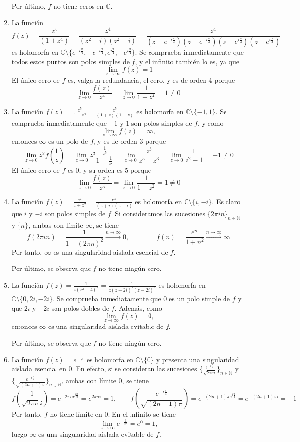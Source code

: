 \documentclass[11pt]{report}
\makeatletter
\renewenvironment{proof}[1][\proofname]{\par
  \pushQED{\qed}%
  \normalfont \topsep\z@skip %
  \trivlist
  \item[\hskip\labelsep
        \itshape
    #1\@addpunct{.}]\ignorespaces
}{%
  \popQED\endtrivlist\@endpefalse
}
\newcommand{\N}{\mathbb N}
\newcommand{\C}{\mathbb C}
\makeatother
\begin{document}
\begin{proof}
\begin{enumerate}
    Por último, $f$ no tiene ceros en $\C$.
    \item La función \[f(z)=\frac{z^4}{(1+z^4)} = \frac{z^4}{(z^2+i)(z^2-i)} = \frac{z^4}{(z-e^{-i\frac{\pi}{4}})(z+e^{-i\frac{\pi}{4}})(z-e^{i\frac{\pi}{4}})(z+e^{i\frac{\pi}{4}})}\]
    es holomorfa en $\C \setminus \{e^{-i\frac{\pi}{4}}, -e^{-i\frac{\pi}{4}},e^{i\frac{\pi}{4}},-e^{i\frac{\pi}{4}}\}$. Se comprueba inmediatamente que todos estos puntos son polos simples de $f$, y el infinito también lo es, ya que
    \[\lim_{z \to \infty}f(z) = 1\]
    El único cero de $f$ es, valga la redundancia, el cero, y es de orden $4$ porque \[\lim_{z \to 0} \frac{f(z)}{z^4} = \lim_{z \to 0} \frac{1}{1+z^4} = 1 \neq 0\]
    \item La función $f(z)=\frac{z^5}{1-z^2} = \frac{z^5}{(1+z)(1-z)}$ es holomorfa en $\C \setminus \{-1,1\}$. Se comprueba inmediatamente que $-1$ y $1$ son polos simples de $f$, y como
    \[\lim_{z \to \infty} f(z)=\infty,\]
    entonces $\infty$ es un polo de $f$, y es de orden $3$ porque
    \[\lim_{z \to 0} z^3f\left(\frac{1}{z}\right) = \lim_{z \to 0}z^3 \frac{\frac{1}{z^5}}{1-\frac{1}{z^2}} = \lim_{z \to 0} \frac{z^3}{z^5-z^3} = \lim_{z \to 0} \frac{1}{z^2-1} = -1 \neq 0\]
    El único cero de $f$ es $0$, y su orden es $5$ porque
    \[\lim_{z \to 0}\frac{f(z)}{z^5} = \lim_{z \to 0} \frac{1}{1-z^2} = 1 \neq 0\]
    \item La función $f(z)=\frac{e^z}{1+z^2} = \frac{e^z}{(z+i)(z-i)}$ es holomorfa en $\C \setminus \{i,-i\}$. Es claro que $i$ y $-i$ son polos simples de $f$. Si consideramos las sucesiones $\{2\pi in\}_{n \in \N}$ y $\{n\}$, ambas con límite $\infty$, se tiene
    \[f(2\pi i n) = \frac{1}{1-(2\pi n)^2} \xrightarrow[]{n \to \infty} 0, \qquad \qquad f(n)=\frac{e^n}{1+n^2} \xrightarrow[]{n \to \infty} \infty\]
    Por tanto, $\infty$ es una singularidad aislada esencial de $f$.

    Por último, se observa que $f$ no tiene ningún cero.
    \item La función $f(z)=\frac{1}{z(z^2+4)^2} = \frac{1}{z(z+2i)^2(z-2i)^2}$ es holomorfa en $\C \setminus \{0,2i,-2i\}$. Se comprueba inmediatamente que $0$ es un polo simple de $f$ y que $2i$ y $-2i$ son polos dobles de $f$. Además, como
    \[\lim_{z \to \infty} f(z)=0,\]
    entonces $\infty$ es una singularidad aislada evitable de $f$.
    
    Por último, se observa que $f$ no tiene ningún cero.
    \item La función $f(z) = e^{-\frac{1}{z^2}}$ es holomorfa en $\C \setminus \{0\}$ y presenta una singularidad aislada esencial en $0$. En efecto, si se consideran las sucesiones $\{\frac{e^{-i\frac{\pi}{4}}}{\sqrt{2\pi n} }\}_{n \in \N}$ y $\{\frac{e^{-i\frac{\pi}{4}}}{\sqrt{(2n+1)\pi}}\}_{n \in \N}$, ambas con límite $0$, se tiene
    \[f\left(\frac{1}{\sqrt{2\pi n} i}\right) = e^{-2\pi ne^{i\frac{\pi}{2}}} = e^{2\pi n i} = 1, \qquad f\left(\frac{e^{-i\frac{\pi}{4}}}{\sqrt{(2n+1)\pi}}\right) = e^{-(2n+1)\pi e^{i\frac{\pi}{2}}} = e^{-(2n+1)\pi i} =-1\]
    Por tanto, $f$ no tiene límite en $0$. En el infinito se tiene
    \[\lim_{z \to \infty}e^{-\frac{1}{z^2}} = e^0=1,\]
    luego $\infty$ es una singularidad aislada evitable de $f$.


\end{enumerate}
\end{proof}
\end{document}
